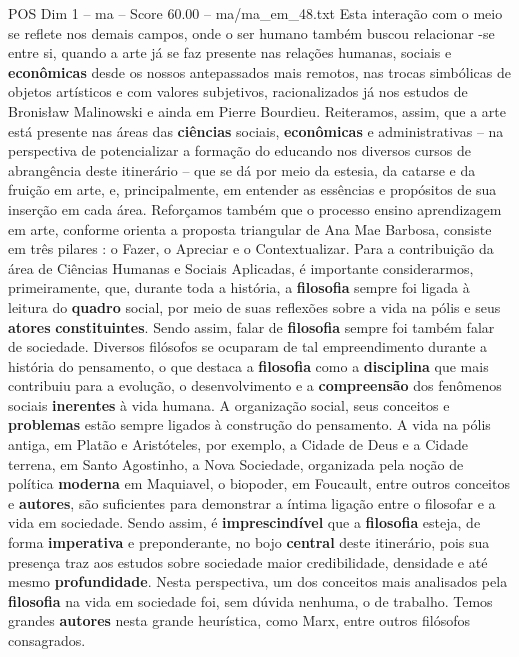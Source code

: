\begin{textsample}{POS Dim 1 – ma – Score 60.00 – ma/ma\_em\_48.txt}
Esta interação com o meio se reflete nos demais campos, onde o ser humano também buscou relacionar -se entre si, quando a arte já se faz presente nas relações humanas, sociais e \textbf{econômicas} desde os nossos antepassados mais remotos, nas trocas simbólicas de objetos artísticos e com valores subjetivos, racionalizados já nos estudos de Bronisław Malinowski e ainda em Pierre Bourdieu.
Reiteramos, assim, que a arte está presente nas áreas das \textbf{ciências} sociais, \textbf{econômicas} e administrativas – na perspectiva de potencializar a formação do educando nos diversos cursos de abrangência deste itinerário – que se dá por meio da estesia, da catarse e da fruição em arte, e, principalmente, em entender as essências e propósitos de sua inserção em cada área.
Reforçamos também que o processo ensino aprendizagem em arte, conforme orienta a proposta triangular de Ana Mae Barbosa, consiste em três pilares : o Fazer, o Apreciar e o Contextualizar.
Para a contribuição da área de Ciências Humanas e Sociais Aplicadas, é importante considerarmos, primeiramente, que, durante toda a história, a \textbf{filosofia} sempre foi ligada à leitura do \textbf{quadro} social, por meio de suas reflexões sobre a vida na pólis e seus \textbf{atores} \textbf{constituintes}.
Sendo assim, falar de \textbf{filosofia} sempre foi também falar de sociedade.
Diversos filósofos se ocuparam de tal empreendimento durante a história do pensamento, o que destaca a \textbf{filosofia} como a \textbf{disciplina} que mais contribuiu para a evolução, o desenvolvimento e a \textbf{compreensão} dos fenômenos sociais \textbf{inerentes} à vida humana.
A organização social, seus conceitos e \textbf{problemas} estão sempre ligados à construção do pensamento.
A vida na pólis antiga, em Platão e Aristóteles, por exemplo, a Cidade de Deus e a Cidade terrena, em Santo Agostinho, a Nova Sociedade, organizada pela noção de política \textbf{moderna} em Maquiavel, o biopoder, em Foucault, entre outros conceitos e \textbf{autores}, são suficientes para demonstrar a íntima ligação entre o filosofar e a vida em sociedade.
Sendo assim, é \textbf{imprescindível} que a \textbf{filosofia} esteja, de forma \textbf{imperativa} e preponderante, no bojo \textbf{central} deste itinerário, pois sua presença traz aos estudos sobre sociedade maior credibilidade, densidade e até mesmo \textbf{profundidade}.
Nesta perspectiva, um dos conceitos mais analisados pela \textbf{filosofia} na vida em sociedade foi, sem dúvida nenhuma, o de trabalho.
Temos grandes \textbf{autores} nesta grande heurística, como Marx, entre outros filósofos consagrados.

\end{textsample}
